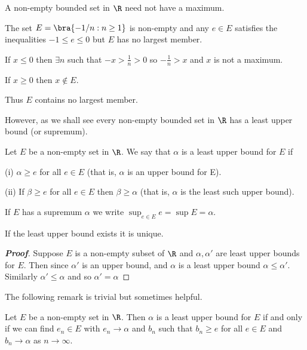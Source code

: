 \begin{theorem}
A non-empty bounded set in $\R$ need not have a maximum.
\end{theorem}

\begin{example}
The set $E= \bra{-1/n : n\geq 1}$ is non-empty and any $e\in E$ satisfies the inequalities $-1 \leq e \leq 0$ but $E$ has no largest member.

If $x \leq 0$ then $\exists n$ such that $-x > \frac{1}{n} > 0$ so $-\frac{1}{n} > x$ and $x$ is not a maximum.

If $x \geq 0$ then $x \notin E$.

Thus $E$ contains no largest member.
\end{example}

However, as we shall see every non-empty bounded set in $\R$ has a least upper bound (or supremum).

\begin{definition}\label{def:supremum_real}
Let $E$ be a non-empty set in $\R$. We say that $\alpha$ is a least upper bound for $E$ if
\ben
\item [(i)] $\alpha \geq e$ for all $e \in E$ (that is, $\alpha$ is an upper bound for E).
\item [(ii)] If $\beta \geq e$ for all $e \in E$ then $\beta \geq \alpha$ (that is, $\alpha$ is the least such upper bound).
\een

If $E$ has a supremum $\alpha$ we write $\sup_{e \in E} e= \sup E = \alpha$.
\end{definition}


\begin{lemma}\label{lem:supremum_real_uniqueness}
If the least upper bound exists it is unique.
\end{lemma}

\begin{proof}[\bf Proof]
Suppose $E$ is a non-empty subset of $\R$ and $\alpha, \alpha'$ are least upper bounds for $E$. Then since $\alpha'$ is an upper bound, and $\alpha$ is a least upper bound $\alpha \leq \alpha'$. Similarly $\alpha' \leq \alpha$ and so $\alpha' = \alpha$
\end{proof}

The following remark is trivial but sometimes helpful.

\begin{lemma}\label{lem:supremum_real_existence}
Let $E$ be a non-empty set in $\R$. Then $\alpha$ is a least upper bound for $E$ if and only if we can find $e_n \in E$ with $e_n \rightarrow \alpha$ and $b_n$ such that $b_n \geq e$ for all $e \in E$ and $b_n \to \alpha$ as $n \to \infty$.
\end{lemma}

